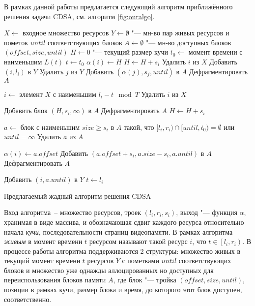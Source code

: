 В рамках данной работы предлагается следующий алгоритм приближённого решения задачи CDSA, см. алгоритм \ref{fig:ouralgo}.
\begin{algorithm}
\begin{algorithmic}[1]
\State $X \gets$ входное множество ресурсов
\State $Y \gets \emptyset$ "--- мн-во пар живых ресурсов и пометок $until$ соответствующих блоков
\State $A \gets \emptyset$ "--- мн-во доступных блоков $(offset, size, until)$
\State $H \gets 0$ "--- текущий размер кучи
\State $t_0 \gets$ момент времени с наименьшим $L(t)$
\State $t \gets t_0$
    \State $\alpha(i) \gets H$
    \State $H \gets H + s_i$
    \State Удалить $i$ из $X$
    \State Добавить $(i, l_i)$ в $Y$
\EndFor
\Repeat
            \State Удалить $j$ из $Y$
            \State Добавить $(\alpha(j), s_j, until)$ в $A$
            \State Дефрагментировать $A$
        \EndIf
    \EndFor

    \State $i \gets$ элемент $X$ с наименьшим $l_i - t \mod T$
    \State Удалить $i$ из $X$

        \State Добавить блок $(H, s_i, \infty)$ в $A$
        \State Дефрагментировать $A$
        \State $H \gets H + s_i$
    \EndIf

    \State $a \gets$ блок с наименьшим $size \geqslant s_i$ в $A$ такой, что $[l_i, r_i) \cap [until, t_0) = \emptyset$ или $until = \infty$
    \State Удалить $a$ из $A$

    \State $\alpha(i) \gets a.offset$
        \State Добавить $(a.offset + s_i, a.size - s_i, a.until)$ в $A$
        \State Дефрагментировать $A$
    \EndIf

    \State Добавить $\left(i, a.until\right)$ в $Y$
    \State $t \gets l_i$
\end{algorithmic}
\caption{Предлагаемый жадный алгоритм решения CDSA}
\label{fig:ouralgo}
\end{algorithm}
Вход алгоритма~-- множество ресурсов, троек $(l_i, r_i, s_i)$, выход "--- функция $\alpha$, хранимая в виде массива, и обозначающая сдвиг каждого ресурса относительно начала \textit{кучи}, последовательности страниц видеопамяти.
В рамках алгоритма \textit{живым} в момент времени $t$ ресурсом называют такой ресурс $i$, что $t \in \left[l_i, r_i\right)$.
В процессе работы алгоритма поддерживаются 2 структуры: множество живых в текущий момент времени $t$ ресурсов $Y$ с пометками $until$ соответствующих блоков и множество уже однажды аллоцированных но доступных для переиспользования блоков памяти $A$, где блок "--- тройка $(offset, size, until)$, позиции в рамках кучи, размер блока и время, до которого этот блок доступен, соответственно.
